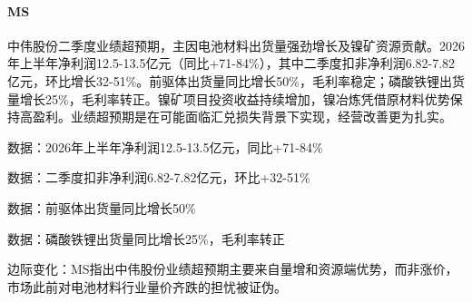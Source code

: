 \documentclass[11pt]{ctexart}
\begin{document}
\paragraph{MS} 中伟股份二季度业绩超预期，主因电池材料出货量强劲增长及镍矿资源贡献。2026年上半年净利润12.5-13.5亿元（同比+71-84\%），其中二季度扣非净利润6.82-7.82亿元，环比增长32-51\%。前驱体出货量同比增长50\%，毛利率稳定；磷酸铁锂出货量增长25\%，毛利率转正。镍矿项目投资收益持续增加，镍冶炼凭借原材料优势保持高盈利。业绩超预期是在可能面临汇兑损失背景下实现，经营改善更为扎实。
{\small\color{refgray}数据：2026年上半年净利润12.5-13.5亿元，同比+71-84\%\par}
{\small\color{refgray}数据：二季度扣非净利润6.82-7.82亿元，环比+32-51\%\par}
{\small\color{refgray}数据：前驱体出货量同比增长50\%\par}
{\small\color{refgray}数据：磷酸铁锂出货量同比增长25\%，毛利率转正\par}
{\small\color{refgray}边际变化：MS指出中伟股份业绩超预期主要来自量增和资源端优势，而非涨价，市场此前对电池材料行业量价齐跌的担忧被证伪。\par}
\end{document}
